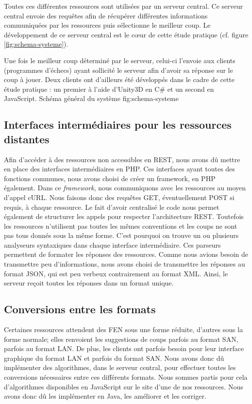 \documentclass[a4paper,11pt]{article}
\begin{document}
Toutes ces différentes ressources sont utilisées par un serveur central. Ce serveur central envoie des requêtes afin de récupérer différentes informations communiquées par les ressources puis sélectionne le meilleur coup. Le développement de ce serveur central est le c{\oe}ur de cette étude pratique (cf. figure \ref{fig:schema-systeme}).

Une fois le meilleur coup déterminé par le serveur, celui-ci l'envoie aux clients (programmes d'échecs) ayant sollicité le serveur afin d'avoir sa réponse sur le coup à jouer. Deux clients ont d'ailleurs été développés dans le cadre de cette étude pratique : un premier à l'aide d'Unity3D en C# et un second en JavaScript.
{Schéma général du système}   
{fig:schema-systeme}

\subsection{Interfaces intermédiaires pour les ressources distantes}
Afin d'accéder à des ressources non accessibles en REST, nous avons dû mettre en place des interfaces intermédiaires en PHP. Ces interfaces ayant toutes des fonctions communes, nous avons choisi de créer un framework, en PHP également. Dans ce {\it framework}, nous communiquons avec les ressources au moyen d'appel cURL. Nous faisons donc des requêtes GET, éventuellement POST si requis, à chaque ressource. Le fait d'avoir centralisé le code nous permet également de structurer les appels pour respecter l'architecture REST. Toutefois les ressources n'utilisent pas toutes les mêmes conventions et les coups ne sont pas tous donnés sous la même forme. C'est pourquoi on trouve un ou plusieurs analyseurs syntaxiques dans chaque interface intermédiaire. Ces parseurs permettent de formater les réponses des ressources. Comme nous avions besoin de transmettre peu d'informations, nous avons choisi de transmettre les réponses au format JSON, qui est peu verbeux contrairement au format XML. Ainsi, le serveur reçoit toutes les réponses dans un format unique.

\subsection{Conversions entre les formats}
Certaines ressources attendent des FEN sous une forme réduite, d'autres sous la forme normale; elles renvoient les suggestions de coups parfois au format SAN, parfois au format LAN. De plus, les clients ont parfois besoin pour leur interface graphique du format LAN et parfois du format SAN. Nous avons donc dû implémenter des algorithmes, dans le serveur central, pour effectuer toutes les conversions nécessaires entre ces différents formats. Nous sommes partis pour cela d'algorithmes disponibles en JavaScript sur le site d'une de nos ressources. Nous avons donc dû les implémenter en Java, les améliorer et les corriger.
\end{document}
